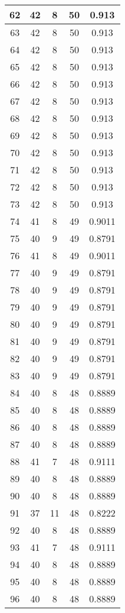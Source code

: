 \documentclass[letterpaper, 12pt]{article}
\begin{document}
\begin{longtable}{|c|c|c|c|c|}
\hline
62 & 42 & 8 & 50 & 0.913 \\
\hline
63 & 42 & 8 & 50 & 0.913 \\
\hline
64 & 42 & 8 & 50 & 0.913 \\
\hline
65 & 42 & 8 & 50 & 0.913 \\
\hline
66 & 42 & 8 & 50 & 0.913 \\
\hline
67 & 42 & 8 & 50 & 0.913 \\
\hline
68 & 42 & 8 & 50 & 0.913 \\
\hline
69 & 42 & 8 & 50 & 0.913 \\
\hline
70 & 42 & 8 & 50 & 0.913 \\
\hline
71 & 42 & 8 & 50 & 0.913 \\
\hline
72 & 42 & 8 & 50 & 0.913 \\
\hline
73 & 42 & 8 & 50 & 0.913 \\
\hline
74 & 41 & 8 & 49 & 0.9011 \\
\hline
75 & 40 & 9 & 49 & 0.8791 \\
\hline
76 & 41 & 8 & 49 & 0.9011 \\
\hline
77 & 40 & 9 & 49 & 0.8791 \\
\hline
78 & 40 & 9 & 49 & 0.8791 \\
\hline
79 & 40 & 9 & 49 & 0.8791 \\
\hline
80 & 40 & 9 & 49 & 0.8791 \\
\hline
81 & 40 & 9 & 49 & 0.8791 \\
\hline
82 & 40 & 9 & 49 & 0.8791 \\
\hline
83 & 40 & 9 & 49 & 0.8791 \\
\hline
84 & 40 & 8 & 48 & 0.8889 \\
\hline
85 & 40 & 8 & 48 & 0.8889 \\
\hline
86 & 40 & 8 & 48 & 0.8889 \\
\hline
87 & 40 & 8 & 48 & 0.8889 \\
\hline
88 & 41 & 7 & 48 & 0.9111 \\
\hline
89 & 40 & 8 & 48 & 0.8889 \\
\hline
90 & 40 & 8 & 48 & 0.8889 \\
\hline
91 & 37 & 11 & 48 & 0.8222 \\
\hline
92 & 40 & 8 & 48 & 0.8889 \\
\hline
93 & 41 & 7 & 48 & 0.9111 \\
\hline
94 & 40 & 8 & 48 & 0.8889 \\
\hline
95 & 40 & 8 & 48 & 0.8889 \\
\hline
96 & 40 & 8 & 48 & 0.8889 \\

\end{longtable}
\end{document}

